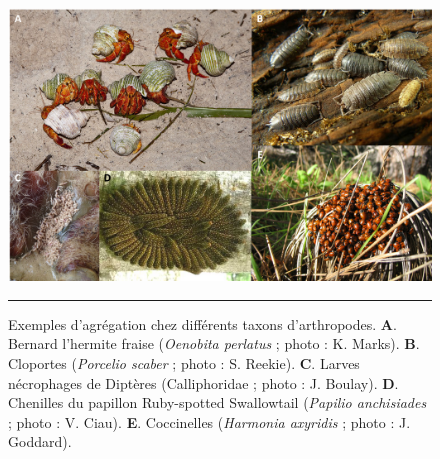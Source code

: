  \begin{figure}[ht]
	\centering
		\includegraphics[width=0.9 \textwidth]{Figures/aggregation.png}
		\rule{35em}{0.5pt}
	\caption[Aggregation]{Exemples d'agrégation chez différents taxons d'arthropodes. \textbf{A}. Bernard l'hermite fraise (\textit{Oenobita perlatus} ; photo : K. Marks). \textbf{B}. Cloportes (\textit{Porcelio scaber} ; photo : S. Reekie). \textbf{C}. Larves nécrophages de Diptères (Calliphoridae ; photo : J. Boulay). \textbf{D}. Chenilles du papillon Ruby-spotted Swallowtail (\textit{Papilio anchisiades} ; photo : V. Ciau). \textbf{E}. Coccinelles (\textit{Harmonia axyridis} ; photo : J. Goddard).}
	\label{fig:aggregation}

\end{figure}



